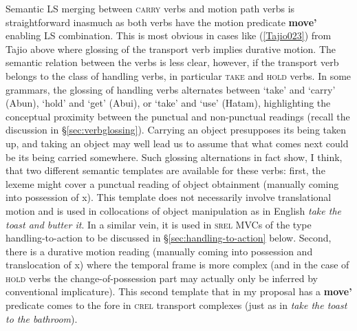 Semantic LS merging between \textsc{carry} verbs and motion path verbs is straightforward inasmuch as both verbs have the motion predicate \textbf{move'} enabling LS combination. This is most obvious in cases like (\ref{Tajio023}) from Tajio above where glossing of the transport verb implies durative motion. The semantic relation between the verbs is less clear, however, if the transport verb belongs to the class of handling verbs, in particular \textsc{take} and \textsc{hold} verbs. In some grammars, the glossing of handling verbs alternates between `take' and `carry' (Abun), `hold' and `get' (Abui), or `take' and `use' (Hatam), highlighting the conceptual proximity between the punctual and non-punctual readings (recall the discussion in §\ref{sec:verbglossing}). Carrying an object presupposes its being taken up, and taking an object may well lead us to assume that what comes next could be its being carried somewhere. Such glossing alternations in fact show, I think, that two different semantic templates are available for these verbs: first, the lexeme might cover a punctual reading of object obtainment (manually coming into possession of x). This template does not necessarily involve translational motion and is used in collocations of object manipulation as in English \textit{take the toast and butter it}. In a similar vein, it is used in \textsc{srel} MVCs of the type handling-to-action to be discussed in §\ref{sec:handling-to-action} below. Second, there is a durative motion reading (manually coming into possession and translocation of x) where the temporal frame is more complex (and in the case of \textsc{hold} verbs the change-of-possession part may actually only be inferred by conventional implicature). This second template that in my proposal has a \textbf{move'} predicate comes to the fore in \textsc{crel} transport complexes (just as in \textit{take the toast to the bathroom}). 

